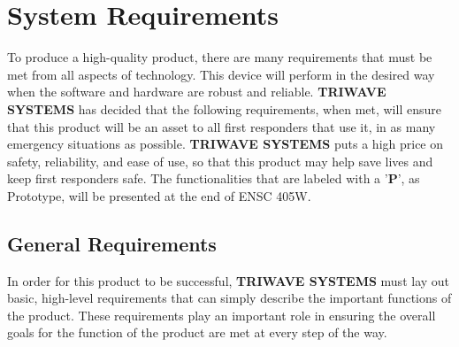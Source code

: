 %

\setcounter{section}{2}
\section{System Requirements}
To produce a high-quality product, there are many requirements that must be met from all aspects of technology. This device will perform in the desired way when the software and hardware are robust and reliable. \textbf{TRIWAVE SYSTEMS} has decided that the following requirements, when met, will ensure that this product will be an asset to all first responders that use it, in as many emergency situations as possible. \textbf{TRIWAVE SYSTEMS} puts a high price on safety, reliability, and ease of use, so that this product may help save lives and keep first responders safe. The functionalities that are labeled with a '\textbf{P}', as Prototype, will be presented at the end of ENSC 405W.


\break
\subsection{General Requirements}
In order for this product to be successful, \textbf{TRIWAVE SYSTEMS} must lay out basic, high-level requirements that can simply describe the important functions of the product. These requirements play an important role in ensuring the overall goals for the function of the product are met at every step of the way.

